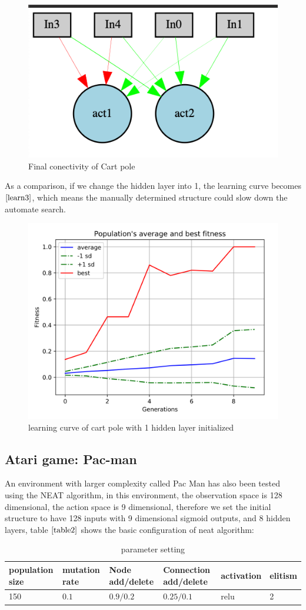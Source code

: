 \documentclass{article}
\begin{document}
 \begin{figure}[htbp]
  \centering
  \includegraphics[width = .5\textwidth]{network_cartpole}
  \caption{Final conectivity of Cart pole}
  \label{evo1}
 \end{figure}

 As a comparison, if we change the hidden layer into 1, the learning curve becomes $\ref{learn3}$, which means the manually determined structure
 could slow down the automate search.

 \begin{figure}[htbp]
  \centering
  \includegraphics[width = .5\textwidth]{learn3}
  \caption{learning curve of cart pole with 1 hidden layer initialized}
  \label{learn3}
 \end{figure}

\subsection{Atari game: Pac-man}
An environment with larger complexity called Pac Man has also been tested using the NEAT algorithm, in this environment,
the observation space is 128 dimensional, the action space is 9 dimensional, therefore we set the initial structure to have
128 inputs with 9 dimensional sigmoid outputs, and 8 hidden layers, table $\ref{table2}$ shows the basic configuration of
neat algorithm:

\begin{table}[htbp]
  \caption{parameter setting}
  \label{table2}
  \centering
  \begin{tabular}{llllll}
    \toprule
    \cmidrule(r){1-6}
    population size & mutation rate & Node add/delete    & Connection add/delete    & activation & elitism  \\
    \midrule
    150&$0.1$ &  $0.9/0.2$  & $0.25/0.1$ & relu &  2    \\
        \bottomrule
  \end{tabular}
\end{table}
\end{document}
